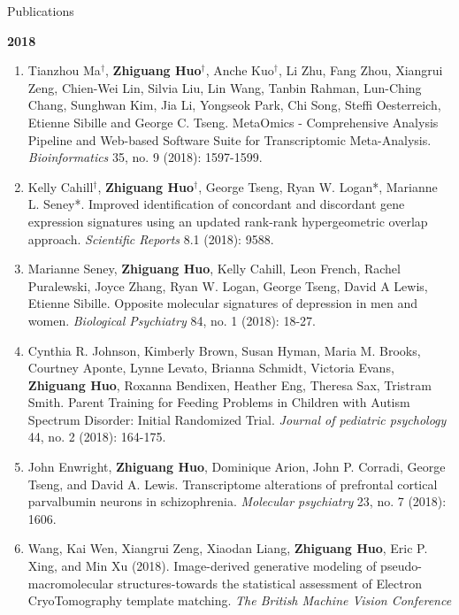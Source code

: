 \documentclass{resume} %
\begin{document}
\begin{rSection}{Publications}
\begin{enumerate}[noitemsep,topsep=0pt,resume]
\end{enumerate}


\textbf{2018}
\begin{enumerate}[noitemsep,topsep=0pt, resume]

\item Tianzhou Ma$^\dagger$, {\bf  Zhiguang Huo$^\dagger$}, Anche Kuo$^\dagger$, Li Zhu, Fang Zhou, Xiangrui Zeng, Chien-Wei Lin, Silvia Liu, Lin Wang, Tanbin Rahman, Lun-Ching Chang, Sunghwan Kim, Jia Li, Yongseok Park, Chi Song, Steffi Oesterreich, Etienne Sibille and George C. Tseng. 
MetaOmics - Comprehensive Analysis Pipeline and Web-based Software Suite for Transcriptomic Meta-Analysis. \emph{Bioinformatics} 35, no. 9 (2018): 1597-1599. 


\item Kelly Cahill$^\dagger$, {\bf  Zhiguang Huo$^\dagger$}, George Tseng, Ryan W. Logan*, Marianne L. Seney*.
Improved identification of concordant and discordant gene expression signatures using an updated rank-rank hypergeometric overlap approach. \emph{Scientific Reports} 8.1 (2018): 9588.

\item Marianne Seney,  {\bf Zhiguang Huo},  Kelly Cahill, Leon French, Rachel Puralewski, Joyce Zhang, Ryan W. Logan, George Tseng, David A Lewis, Etienne Sibille. Opposite molecular signatures of depression in men and women. \emph{Biological Psychiatry}  84, no. 1 (2018): 18-27.

\item 
Cynthia R. Johnson, Kimberly Brown, Susan Hyman, Maria M. Brooks, Courtney Aponte, Lynne Levato, Brianna Schmidt,
Victoria Evans, {\bf Zhiguang Huo},  Roxanna Bendixen, Heather Eng, Theresa Sax, Tristram Smith.
Parent Training for Feeding Problems in Children with Autism Spectrum Disorder: Initial Randomized Trial. \emph{Journal of pediatric psychology} 44, no. 2 (2018): 164-175.

\item 
John Enwright, {\bf Zhiguang Huo}, Dominique Arion, John P. Corradi, George Tseng, and David A. Lewis. 
Transcriptome alterations of prefrontal cortical parvalbumin neurons in schizophrenia. 
\emph{Molecular psychiatry} 23, no. 7 (2018): 1606.


\item 
Wang, Kai Wen, Xiangrui Zeng, Xiaodan Liang, {\bf Zhiguang Huo}, Eric P. Xing, and Min Xu (2018). Image-derived generative modeling of pseudo-macromolecular structures-towards the statistical assessment of Electron CryoTomography template matching. \emph{The British Machine Vision Conference}


\end{enumerate}
\end{rSection}
\end{document}
